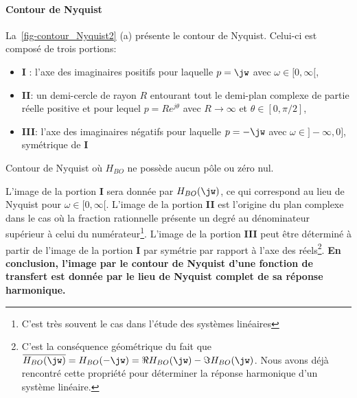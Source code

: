 \paragraph{Contour de Nyquist}
La~\cref{fig-contour_Nyquist2} (a) présente le contour de Nyquist. Celui-ci est 
composé de trois portions:
\begin{itemize}
    \item \textbf{I} : l'axe des imaginaires positifs pour laquelle $p=\jw$ 
          avec $\omega\in[0,\infty[$,
    \item \textbf{II}: un demi-cercle de rayon $R$ entourant tout le 
          demi-plan complexe de partie réelle positive et pour lequel 
          $p=Re^{j\theta}$ avec $R\rightarrow\infty$ et $\theta\in[0,\pi/2]$,
    \item \textbf{III}: l'axe des imaginaires négatifs  pour laquelle $p=-\jw$ 
          avec $\omega\in]-\infty,0]$, symétrique de \textbf{I}
\end{itemize}
\begin{marginfigure}
    \centering
    
    \caption{Contour de Nyquist où $H_{BO}$ ne possède aucun pôle ou zéro nul.
    \label{fig-contour_Nyquist2}}
\end{marginfigure}
L'image de la portion \textbf{I} sera donnée par $H_{BO}(\jw)$, ce qui 
correspond au lieu de Nyquist pour $\omega\in[0,\infty[$. L'image de la 
portion \textbf{II} est l'origine du plan complexe dans le cas où la fraction
rationnelle présente un degré au dénominateur supérieur à celui du 
numérateur\footnote{C'est très souvent le cas dans l'étude des systèmes 
linéaires}. 
L'image de la portion \textbf{III} peut être 
déterminé à partir de l'image de la portion \textbf{I} par symétrie par 
rapport à l'axe des réels\footnote{C'est la conséquence géométrique du fait que
$\overline{H_{BO}(\jw)}=H_{BO}(-\jw)=\Re{H_{BO}(\jw)}-\Im{H_{BO}(\jw)}$. 
Nous avons déjà rencontré cette propriété pour déterminer la réponse harmonique
d'un système linéaire.}.
\textbf{En conclusion, l'image par le contour de Nyquist d'une fonction de 
transfert est donnée par le lieu de Nyquist complet de sa réponse harmonique.}
